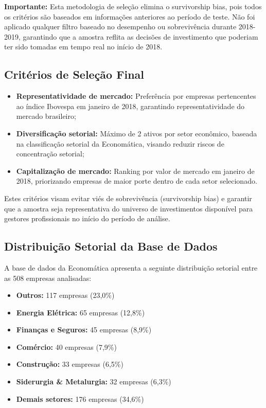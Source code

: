 \textbf{Importante:} Esta metodologia de seleção elimina o survivorship bias, pois todos os critérios são baseados em informações anteriores ao período de teste. Não foi aplicado qualquer filtro baseado no desempenho ou sobrevivência durante 2018-2019, garantindo que a amostra reflita as decisões de investimento que poderiam ter sido tomadas em tempo real no início de 2018.

\subsection{Critérios de Seleção Final}

\begin{itemize}
    \item \textbf{Representatividade de mercado:} Preferência por empresas pertencentes ao índice Ibovespa em janeiro de 2018, garantindo representatividade do mercado brasileiro;
    
    \item \textbf{Diversificação setorial:} Máximo de 2 ativos por setor econômico, baseada na classificação setorial da Economática, visando reduzir riscos de concentração setorial;
    
    \item \textbf{Capitalização de mercado:} Ranking por valor de mercado em janeiro de 2018, priorizando empresas de maior porte dentro de cada setor selecionado.
\end{itemize}

Estes critérios visam evitar viés de sobrevivência (survivorship bias) e garantir que a amostra seja representativa do universo de investimentos disponível para gestores profissionais no início do período de análise.

\subsection{Distribuição Setorial da Base de Dados}

A base de dados da Economática apresenta a seguinte distribuição setorial entre as 508 empresas analisadas:

\begin{itemize}
    \item \textbf{Outros:} 117 empresas (23,0\%)
    \item \textbf{Energia Elétrica:} 65 empresas (12,8\%)
    \item \textbf{Finanças e Seguros:} 45 empresas (8,9\%)
    \item \textbf{Comércio:} 40 empresas (7,9\%)
    \item \textbf{Construção:} 33 empresas (6,5\%)
    \item \textbf{Siderurgia \& Metalurgia:} 32 empresas (6,3\%)
    \item \textbf{Demais setores:} 176 empresas (34,6\%)
\end{itemize}

